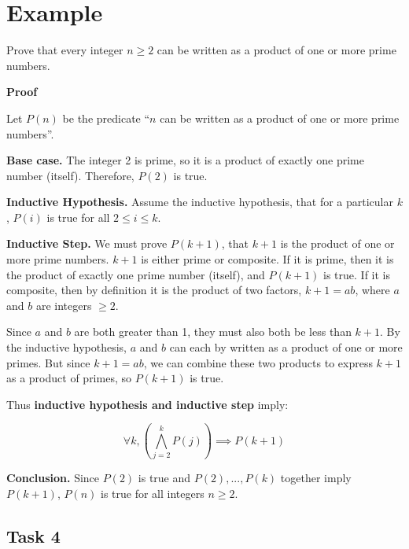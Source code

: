 \documentclass[12pt,letterpaper]{article}
\begin{document}
\section*{Example}

Prove that every integer $n \geq 2$ can be written as a product of one or more prime numbers.

\textbf{Proof}

Let $P(n)$ be the predicate “$n$ can be written as a product of one or more prime numbers”.

\textbf{Base case.} The integer 2 is prime, so it is a product of exactly one prime number (itself). Therefore, $P(2)$ is true.

\textbf{Inductive Hypothesis.} Assume the inductive hypothesis, that for a particular $k$, $P(i)$ is true for all $2 \leq i \leq k$.




\textbf{Inductive Step.} We must prove $P(k + 1)$, that $k + 1$ is the product of one or more prime numbers. $k + 1$ is either prime or composite. If it is prime, then it is the product of exactly one prime number (itself), and $P(k + 1)$ is true. If it is composite, then by definition it is the product of two factors, $k + 1 = ab$, where $a$ and $b$ are integers $\geq 2$.

Since $a$ and $b$ are both greater than 1, they must also both be less than $k + 1$. By the inductive hypothesis, $a$ and $b$ can each by written as a product of one or more primes. But since $k + 1 = ab$, we can combine these two products to express $k + 1$ as a product of primes, so $P(k + 1)$ is true.


\smallskip 

Thus \textbf{inductive hypothesis and inductive step} imply:

$$\forall k, (\bigwedge_{j=2}^k P(j))\implies P(k+1)$$

\textbf{Conclusion.} Since $P(2)$ is true and $P(2),...,P(k)$ together imply $P(k + 1)$, $P(n)$ is true for all integers $n \geq 2$.

\newpage
\subsection*{Task 4}
\end{document}
